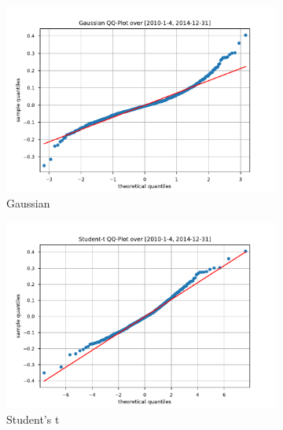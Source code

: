 \begin{figure}[htbp]
    \centering
    \begin{subfigure}[b]{0.32\textwidth}
        \centering
        \includegraphics[width=\textwidth]{content/reschap4/Figures/gauss_QQ_2010-1-4-2014-12-31.pdf}
        \caption{Gaussian}
    \end{subfigure}
    \hfill
    \begin{subfigure}[b]{0.32\textwidth}
        \centering
        \includegraphics[width=\textwidth]{content/reschap4/Figures/student_QQ_2010-1-4-2014-12-31.pdf}
        \caption{Student's t}
    \end{subfigure}
    \hfill
    \begin{subfigure}[b]{0.32\textwidth}
        \centering

\end{subfigure}
\end{figure}
